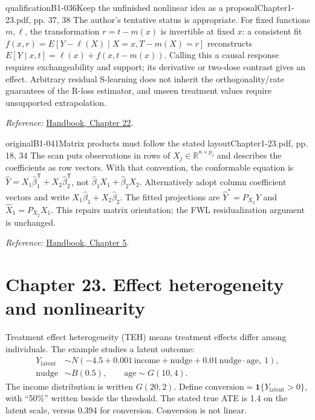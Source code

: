 {\begin{reviewnote}{qualification}{B1-036}{Keep the unfinished nonlinear idea as a proposal}{Chapter1-23.pdf, pp. 37, 38}
The author's tentative status is appropriate. For fixed functions $m,\ell$, the transformation $r=t-m(x)$ is invertible at fixed $x$: a consistent fit $f(x,r)=E[Y-\ell(X)\mid X=x,T-m(X)=r]$ reconstructs $E[Y\mid x,t]=\ell(x)+f(x,t-m(x))$. Calling this a causal response requires exchangeability and support; its derivative or two-dose contrast gives an effect. Arbitrary residual S-learning does not inherit the orthogonality/rate guarantees of the R-loss estimator, and unseen treatment values require unsupported extrapolation.
\par\smallskip\textit{Reference:} \href{https://matheusfacure.github.io/python-causality-handbook/22-Debiased-Orthogonal-Machine-Learning.html}{Handbook, Chapter 22}.
\end{reviewnote}
\begin{reviewnote}{original}{B1-041}{Matrix products must follow the stated layout}{Chapter1-23.pdf, pp. 18, 34}
The scan puts observations in rows of $X_j\in\mathbb R^{n\times p_j}$ and describes the coefficients as row vectors. With that convention, the conformable equation is $\hat Y=X_1\hat\beta_1^{\mathsf T}+X_2\hat\beta_2^{\mathsf T}$, not $\hat\beta_1X_1+\hat\beta_2X_2$. Alternatively adopt column coefficient vectors and write $X_1\hat\beta_1+X_2\hat\beta_2$. The fitted projections are $\hat Y^*=P_{X_2}Y$ and $\hat X_1=P_{X_2}X_1$. This repairs matrix orientation; the FWL residualization argument is unchanged.
\par\smallskip\textit{Reference:} \href{https://matheusfacure.github.io/python-causality-handbook/05-The-Unreasonable-Effectiveness-of-Linear-Regression.html}{Handbook, Chapter 5}.
\end{reviewnote}

\section{Chapter 23. Effect heterogeneity and nonlinearity}
Treatment effect heterogeneity (TEH) means treatment effects differ among individuals. The example studies a latent outcome:
\begin{align*}
Y_{\mathrm{latent}}&\sim N(-4.5+0.001\,\mathrm{income}+\mathrm{nudge}
+0.01\,\mathrm{nudge}\cdot\mathrm{age},\ 1),\\
\mathrm{nudge}&\sim B(0.5),\qquad \mathrm{age}\sim G(10,4).
\end{align*}
The income distribution is written $G(20,2)$.  Define $\mathrm{conversion}=\mathbf1\{Y_{\mathrm{latent}}>0\}$, with ``50\%'' written beside the threshold. The stated true ATE is 1.4 on the latent scale, versus 0.394 for conversion. Conversion is not linear.

}
